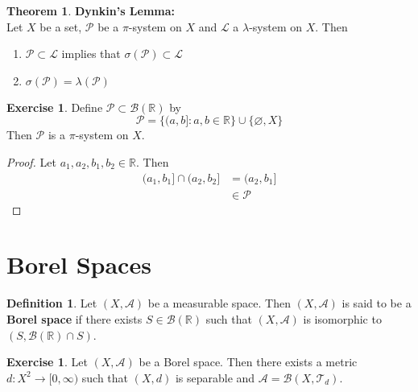 \documentclass{book}
\theoremstyle{definition}
\newtheorem{defn}[definition]{Definition}
\newtheorem{thm}[definition]{Theorem}
\newtheorem{ex}[definition]{Exercise}
\newcommand{\lam}{\lambda}
\newcommand{\sig}{\sigma}
\newcommand{\R}{\mathbb{R}}
\newcommand{\MA}{\mathcal{A}}
\newcommand{\MB}{\mathcal{B}}
\newcommand{\ML}{\mathcal{L}}
\newcommand{\MP}{\mathcal{P}}
\newcommand{\MT}{\mathcal{T}}
\newcommand{\lex}[1]{\label{ex:#1}}
\DeclareMathOperator*{\0}{\mbf{0}}
\DeclareMathOperator*{\1}{\mbf{1}}
\newcommand{\Rg}{[0,\infty)}
\begin{document}
	\begin{thm} \textbf{Dynkin's Lemma:} \\
		Let $X$ be a set, $\MP$ be a $\pi$-system on $X$ and $\ML$ a $\lam$-system on $X$. Then
		\begin{enumerate}
			\item $\MP \subset \ML$ implies that $\sig(\MP) \subset \ML$ 
			\item $\sig(\MP) = \lam(\MP)$
		\end{enumerate} 
	\end{thm}
	
	\begin{ex}
		Define $\MP \subset \MB(\R)$ by $$\MP = \{(a,b]: a,b \in \R\} \cup \{\varnothing, X\}$$
		Then $\MP$ is a $\pi$-system on $X$.
	\end{ex}

	\begin{proof}
		Let $a_1, a_2, b_1, b_2 \in \R$. Then 
		\begin{align*}
			(a_1, b_1] \cap (a_2, b_2] 
			& = (a_2, b_1] \\
			& \in \MP
		\end{align*} 
	\end{proof}






























	\newpage
	\section{Borel Spaces}
	
	\begin{defn} \lex{28007} 
		Let $(X, \MA)$ be a measurable space. Then $(X, \MA)$ is said to be a \textbf{Borel space} if there exists $S \in \MB(\R)$ such that $(X, \MA)$ is isomorphic to $(S, \MB(\R) \cap S)$.
	\end{defn}

	\begin{ex}
		Let $(X, \MA)$ be a Borel space. Then there exists a metric $d:X^2 \rightarrow \Rg$ such that $(X, d)$ is separable and $\MA = \MB(X, \MT_{d})$.
	\end{ex}
\end{document}
